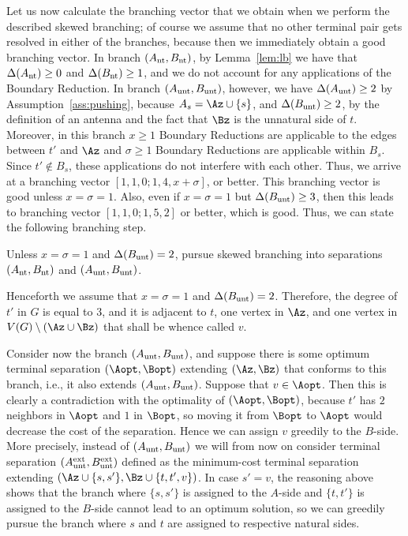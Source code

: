 Let us now calculate the branching vector that we obtain when we perform the described skewed branching; of course we assume that no other terminal pair gets resolved in either of the branches, because then we immediately obtain a good branching vector. In branch $(A_{\text{nt}},B_{\text{nt}})$, by Lemma~\ref{lem:lb} we have that $\Delta(A_{\text{nt}})\geq 0$ and $\Delta(B_{\text{nt}})\geq 1$, and we do not account for any applications of the Boundary Reduction. In branch $(A_{\text{unt}},B_{\text{unt}})$, however, we have $\Delta(A_{\text{unt}})\geq 2$ by Assumption~\ref{ass:pushing}, because $A_s=\Az\cup \{s\}$, and $\Delta(B_{\text{unt}})\geq 2$, by the definition of an antenna and the fact that $\Bz$ is the unnatural side of $t$. Moreover, in this branch $x\geq 1$ Boundary Reductions are applicable to the edges between $t'$ and $\Az$ and $\sigma\geq 1$ Boundary Reductions are applicable within $B_s$. Since $t'\notin B_s$, these applications do not interfere with each other. Thus, we arrive at a branching vector $[1,1,0;1,4,x+\sigma]$, or better. This branching vector is good unless $x=\sigma=1$. Also, even if $x=\sigma=1$ but $\Delta(B_{\text{unt}})\geq 3$, then this leads to branching vector $[1,1,0;1,5,2]$ or better, which is good. Thus, we can state the following branching step.

\begin{branching}
Unless $x=\sigma=1$ and $\Delta(B_{\text{unt}})=2$, pursue skewed branching into separations $(A_{\text{nt}},B_{\text{nt}})$ and $(A_{\text{unt}},B_{\text{unt}})$.
\end{branching}









Henceforth we assume that $x=\sigma=1$ and $\Delta(B_{\text{unt}})=2$. Therefore, the degree of $t'$ in $G$ is equal to $3$, and it is adjacent to $t$, one vertex in $\Az$, and one vertex in $V(G)\setminus (\Az\cup \Bz)$ that shall be whence called $v$.

Consider now the branch $(A_{\text{unt}},B_{\text{unt}})$, and suppose there is some optimum terminal separation $(\Aopt,\Bopt)$ extending $(\Az,\Bz)$ that conforms to this branch, i.e., it also extends $(A_{\text{unt}},B_{\text{unt}})$. Suppose that $v\in \Aopt$. Then this is clearly a contradiction with the optimality of $(\Aopt,\Bopt)$, because $t'$ has $2$ neighbors in $\Aopt$ and $1$ in $\Bopt$, so moving it from $\Bopt$ to $\Aopt$ would decrease the cost of the separation. Hence we can assign $v$ greedily to the $B$-side. More precisely, instead of $(A_{\text{unt}},B_{\text{unt}})$ we will from now on consider terminal separation $(A_{\text{unt}}^{\text{ext}},B_{\text{unt}}^{\text{ext}})$ defined as the minimum-cost terminal separation extending $(\Az\cup \{s,s'\},\Bz\cup \{t,t',v\})$. In case $s'=v$, the reasoning above shows that the branch where $\{s,s'\}$ is assigned to the $A$-side and $\{t,t'\}$ is assigned to the $B$-side cannot lead to an optimum solution, so we can greedily pursue the branch where $s$ and $t$ are assigned to respective natural sides.


